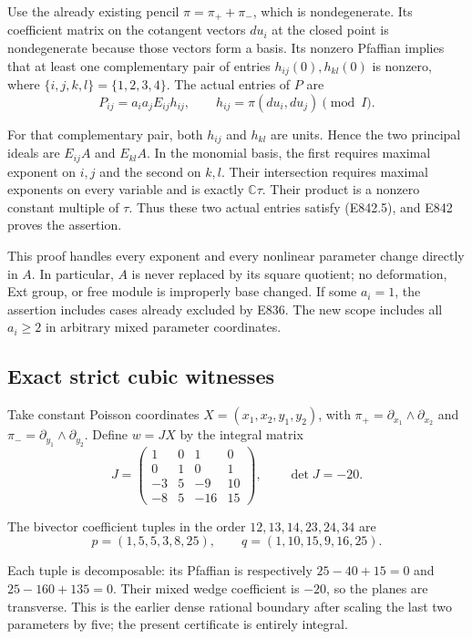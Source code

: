 Use the already existing pencil \(\pi=\pi_++\pi_-\), which is
nondegenerate. Its coefficient matrix on the cotangent vectors \(du_i\)
at the closed point is nondegenerate because those vectors form a basis.
Its nonzero Pfaffian implies that at least one complementary pair of entries
\(h_{ij}(0),h_{kl}(0)\) is nonzero, where
\(\{i,j,k,l\}=\{1,2,3,4\}\). The actual entries of \(P\) are
\[
 P_{ij}=a_i a_j E_{ij}h_{ij},\qquad
                   h_{ij}=\pi(du_i,du_j)\pmod I.
 \tag{E843.2}
\]

For that complementary pair, both \(h_{ij}\) and \(h_{kl}\) are units.
Hence the two principal ideals are \(E_{ij}A\) and \(E_{kl}A\).
In the monomial basis, the first requires maximal exponent on \(i,j\)
and the second on \(k,l\). Their intersection requires maximal exponents
on every variable and is exactly \(\mathbb C\tau\).
Their product is a nonzero constant multiple of \(\tau\).
Thus these two actual entries satisfy (E842.5), and E842 proves the assertion.

This proof handles every exponent and every nonlinear parameter change
directly in \(A\). In particular, \(A\) is never replaced by its square
quotient; no deformation, Ext group, or free module is improperly base changed.
If some \(a_i=1\), the assertion includes cases already excluded by E836.
The new scope includes all \(a_i\ge2\) in arbitrary mixed parameter coordinates.

\subsection{Exact strict cubic witnesses}
\label{SF-E843:witnesses}

Take constant Poisson coordinates \(X=(x_1,x_2,y_1,y_2)\), with
\(\pi_+=\partial_{x_1}\wedge\partial_{x_2}\) and
\(\pi_-=\partial_{y_1}\wedge\partial_{y_2}\).
Define \(w=JX\) by the integral matrix
\[
 J=\begin{pmatrix}
 1&0&1&0\\
 0&1&0&1\\
 -3&5&-9&10\\
 -8&5&-16&15
 \end{pmatrix},\qquad \det J=-20.
 \tag{E843.3}
\]

The bivector coefficient tuples in the order \(12,13,14,23,24,34\) are
\[
 p=(1,5,5,3,8,25),\qquad q=(1,10,15,9,16,25).
 \tag{E843.4}
\]

Each tuple is decomposable: its Pfaffian is respectively
\(25-40+15=0\) and \(25-160+135=0\).
Their mixed wedge coefficient is \(-20\), so the planes are transverse.
This is the earlier dense rational boundary after scaling the last two
parameters by five; the present certificate is entirely integral.

